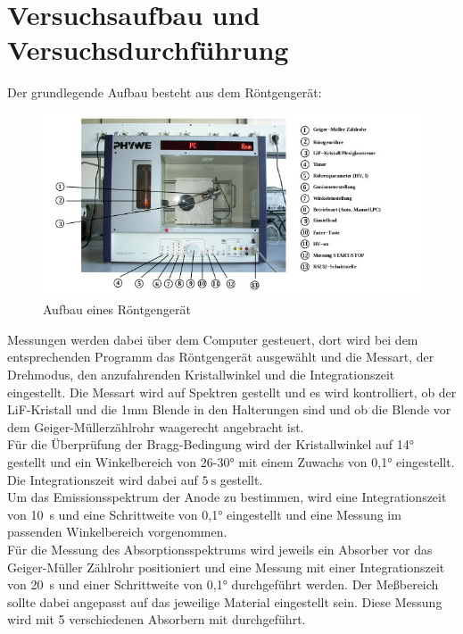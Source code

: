 \section{Versuchsaufbau und Versuchsdurchführung}\justifying

Der grundlegende Aufbau besteht aus dem Röntgengerät:
\begin{figure}[H]
    \centering
    \includegraphics[width=\linewidth]{images/Aufbau1.jpg}
    \caption{Aufbau eines Röntgengerät\cite{V603}}
    \label{fig:1}
\end{figure}
\justifying Messungen werden dabei über dem Computer gesteuert, dort wird bei dem entsprechenden Programm
das Röntgengerät ausgewählt und die Messart, der Drehmodus, den anzufahrenden Kristallwinkel und die 
Integrationszeit eingestellt. Die Messart wird auf Spektren gestellt und es wird kontrolliert, ob der
LiF-Kristall und die 1mm Blende in den Halterungen sind und ob die Blende vor dem Geiger-Müllerzählrohr
waagerecht angebracht ist. \\
Für die Überprüfung der Bragg-Bedingung wird der Kristallwinkel auf 14° gestellt und ein Winkelbereich von 26-30°
mit einem Zuwachs von 0,1° eingestellt. Die Integrationszeit wird dabei auf $\SI{5}{\second}$ gestellt.\\
Um das Emissionsspektrum der Anode zu bestimmen, wird eine Integrationszeit von \SI{10}{\second} und
eine Schrittweite von 0,1° eingestellt und eine Messung im passenden Winkelbereich vorgenommen.\\
Für die Messung des Absorptionsspektrums wird jeweils ein Absorber vor das Geiger-Müller Zählrohr positioniert
und eine Messung mit einer Integrationszeit von \SI{20}{\second} und einer Schrittweite von 0,1° durchgeführt werden.
Der Meßbereich sollte dabei angepasst auf das jeweilige Material eingestellt sein. Diese Messung 
wird mit 5 verschiedenen Absorbern mit durchgeführt.

